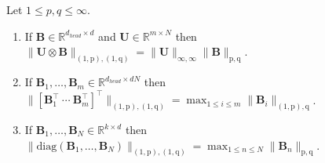 \documentclass[10pt,a4paper]{amsart}
\newcommand{\Matrix}[1]{\mathbf{#1}}
\newcommand{\Norm}[3][]{#1\| #2 #1\|_{\mathrm{#3}}}
\newcommand{\Real}{\mathbb{R}}
\newcommand{\diag}[2][]{\mathrm{diag}#1( #2 #1)}
\newcommand{\krp}{\mathbin{\otimes}}
\newcommand{\trans}{\intercal}
\begin{document}
\begin{lemma}
\label{lemma:1p-norm}
Let $1 \leq p, q \leq \infty$.
\begin{enumerate}
    \item If $\Matrix{B} \in \Real^{d_{head} \times d}$ and $\Matrix{U} \in \Real^{m \times N}$ then $\Norm{\Matrix{U} \krp \Matrix{B}}{(1,p),(1,q)} = \Norm{\Matrix{U}}{\infty,\infty} \Norm{\Matrix{B}}{p,q}$.
    \item If $\Matrix{B}_1, \ldots, \Matrix{B}_m \in \Real^{d_{head} \times dN}$ then $\Norm{[\Matrix{B}_1^\trans~\cdots~\Matrix{B}_m^\trans]^\trans}{(1,p),(1,q)} = \max_{1 \leq i \leq m} \Norm{\Matrix{B}_i}{(1,p),q}$.
    \item If $\Matrix{B}_1, \ldots, \Matrix{B}_N \in \Real^{k \times d}$ then $\Norm{\diag{\Matrix{B}_1, \ldots, \Matrix{B}_N}}{(1,p),(1,q)} = \max_{1 \leq n \leq N} \Norm{\Matrix{B}_n}{p,q}$.
\end{enumerate}
\end{lemma}
\end{document}
